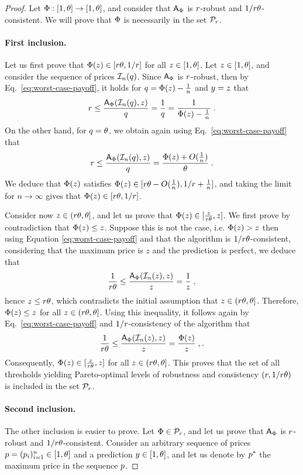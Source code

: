 \begin{proof}
Let $\Phi : [1,\theta] \to [1,\theta]$, and consider that $\mbox{\textup{\textsf{A}}}_\Phi$ is $r$-robust and $1/r \theta$-consistent. We will prove that $\Phi$ is necessarily in the set $\mathcal{P}_r$.
\paragraph{First inclusion.} Let us first prove that $\Phi(z) \in [r\theta, 1/r]$ for all $z \in [1,\theta]$.
Let $z \in [1,\theta]$, and consider the sequence of prices $\mathcal{I}_n(q)$. Since $\mbox{\textup{\textsf{A}}}_\Phi$ is $r$-robust, then by Eq.~\eqref{eq:worst-case-payoff}, it holds for $q = \Phi(z)-\tfrac{1}{n}$ and $y = z$ that
\[
r \leq \frac{\mbox{\textup{\textsf{A}}}_\Phi(\mathcal{I}_n(q),z)}{q} = \frac{1}{q} = \frac{1}{\Phi(z)-\tfrac{1}{n}}\;.
\]
On the other hand, for $q = \theta$, we obtain again using Eq.~\eqref{eq:worst-case-payoff} that
\[
r \leq \frac{\mbox{\textup{\textsf{A}}}_\Phi(\mathcal{I}_n(q),z)}{q} = \frac{\Phi(z) + O(\tfrac{1}{n})}{\theta}\;.
\]
We deduce that $\Phi(z)$ satisfies $\Phi(z) \in [r \theta - O(\tfrac{1}{n}), 1/r + \tfrac{1}{n}]$, and taking the limit for $n\to \infty$ gives that $\Phi(z) \in [r \theta, 1/r]$.

Consider now $z \in (r \theta, \theta]$, and let us prove that $\Phi(z) \in [\frac{z}{r \theta}, z]$. We first prove by contradiction that $\Phi(z) \leq z$. Suppose this is not the case, i.e. $\Phi(z) > z$ then using Equation \eqref{eq:worst-case-payoff} and that the algorithm is $1/r \theta$-consistent, considering that the maximum price is $z$ and the prediction is perfect, we deduce that
\[
\frac{1}{r \theta} \leq \frac{\mbox{\textup{\textsf{A}}}_\Phi(\mathcal{I}_n(z),z)}{z} = \frac{1}{z}\;,
\]
hence $z \leq r \theta$, which contradicts the initial assumption that $z \in (r \theta, \theta]$. Therefore, $\Phi(z) \leq z$  for all $z \in (r \theta, \theta]$. Using this inequality, it follows again by Eq.~\eqref{eq:worst-case-payoff} and $1/r$-consistency of the algorithm that
\[
\frac{1}{r \theta} \leq \frac{\mbox{\textup{\textsf{A}}}_\Phi(\mathcal{I}_n(z),z)}{z} = \frac{\Phi(z)}{z}\;,.
\]
Consequently, $\Phi(z) \in [\frac{z}{r \theta}, z]$ for all $z \in (r \theta, \theta]$. This proves that the set of all thresholds yielding Pareto-optimal levels of robustness and consistency $(r, 1/r\theta)$ is included in the set $\mathcal{P}_r$.

\paragraph{Second inclusion.} 
The other inclusion is easier to prove. Let $\Phi \in \mathcal{P}_r$, and let us prove that $\mbox{\textup{\textsf{A}}}_\Phi$ is $r$-robust and $1/r \theta$-consistent. Consider an arbitrary sequence of prices $p = (p_i)_{i=1}^n \in [1,\theta]$ and a prediction $y \in [1,\theta]$, and let us denote by $p^*$ the maximum price in the sequence $p$.


\end{proof}
